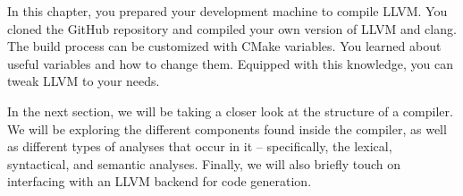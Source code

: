 In this chapter, you prepared your development machine to compile LLVM. You cloned the GitHub repository and compiled your own version of LLVM and clang. The build process can be customized with CMake variables. You learned about useful variables and how to change them. Equipped with this knowledge, you can tweak LLVM to your needs.

In the next section, we will be taking a closer look at the structure of a compiler. We will be exploring the different components found inside the compiler, as well as different types of analyses that occur in it – specifically, the lexical, syntactical, and semantic analyses. Finally, we will also briefly touch on interfacing with an LLVM backend for code generation.